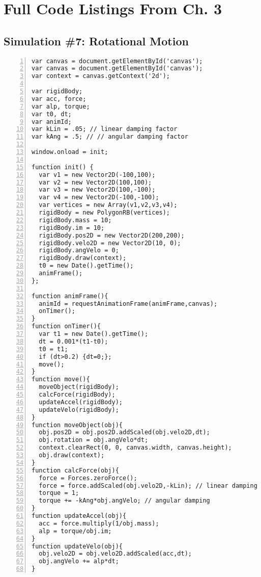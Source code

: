 
\chapter{Full Code Listings From Ch. 3} %

\label{AppendixC} %


\section{Simulation \#7: Rotational Motion}

\begin{lstlisting}[breaklines=true, frame=single, numbers=left, caption=Rotational Motion Simulation]
var canvas = document.getElementById('canvas');
var canvas = document.getElementById('canvas');
var context = canvas.getContext('2d'); 

var rigidBody;
var acc, force; 
var alp, torque;
var t0, dt;
var animId;
var kLin = .05; // linear damping factor  
var kAng = .5; // // angular damping factor 

window.onload = init; 

function init() {
  var v1 = new Vector2D(-100,100);
  var v2 = new Vector2D(100,100);
  var v3 = new Vector2D(100,-100);
  var v4 = new Vector2D(-100,-100);
  var vertices = new Array(v1,v2,v3,v4);
  rigidBody = new PolygonRB(vertices);
  rigidBody.mass = 10;
  rigidBody.im = 10;
  rigidBody.pos2D = new Vector2D(200,200);  
  rigidBody.velo2D = new Vector2D(10, 0);     
  rigidBody.angVelo = 0;  
  rigidBody.draw(context);
  t0 = new Date().getTime(); 
  animFrame();
};

function animFrame(){
  animId = requestAnimationFrame(animFrame,canvas);
  onTimer(); 
}
function onTimer(){
  var t1 = new Date().getTime(); 
  dt = 0.001*(t1-t0); 
  t0 = t1;
  if (dt>0.2) {dt=0;};  
  move();
}
function move(){      
  moveObject(rigidBody);
  calcForce(rigidBody);
  updateAccel(rigidBody);
  updateVelo(rigidBody);
}
function moveObject(obj){
  obj.pos2D = obj.pos2D.addScaled(obj.velo2D,dt); 
  obj.rotation = obj.angVelo*dt;
  context.clearRect(0, 0, canvas.width, canvas.height);
  obj.draw(context);  
}
function calcForce(obj){
  force = Forces.zeroForce();
  force = force.addScaled(obj.velo2D,-kLin); // linear damping
  torque = 1;
  torque += -kAng*obj.angVelo; // angular damping   
} 
function updateAccel(obj){
  acc = force.multiply(1/obj.mass);
  alp = torque/obj.im;
} 
function updateVelo(obj){
  obj.velo2D = obj.velo2D.addScaled(acc,dt);  
  obj.angVelo += alp*dt;  
}
\end{lstlisting}

